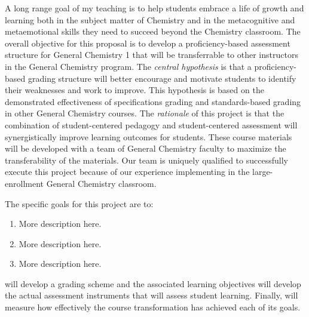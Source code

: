 \documentclass[10pt,letterpaper]{article}
\begin{document}
A long range goal of my teaching is to help students embrace a life of growth and learning both in the subject matter of Chemistry and in the metacognitive and metaemotional skills they need to succeed beyond the Chemistry classroom.
%
The overall objective for this proposal is to develop a proficiency-based assessment structure for General Chemistry 1 that will be transferrable to other instructors in the General Chemistry program. 
The \textit{central hypothesis} is that a proficiency-based grading structure will better encourage and motivate students to identify their weaknesses and work to improve. 
%
This hypothesis is based on the demonstrated effectiveness of specifications grading and standards-based grading in other General Chemistry courses.\cite{Boesdorfer2018,Martin2019}
The \textit{rationale} of this project is that the combination of student-centered pedagogy  and student-centered assessment will synergistically improve learning outcomes for students.  These course materials will be developed with a team of General Chemistry faculty to maximize the transferability of the materials. 
Our team is uniquely qualified to successfully execute this project because of our experience implementing \pogil in the large-enrollment General Chemistry classroom.

The specific goals for this project are to:
\begin{enumerate}[nosep,label=\textbf{\arabic*}.]
\item {} 
More description here.

\item {}
More description here.

\item {}
More description here.
\end{enumerate}
 will develop a grading scheme and the associated learning objectives
 will develop the actual assessment instruments that will assess student learning. Finally,  will measure how effectively the course transformation has achieved each of its goals.
\end{document}
